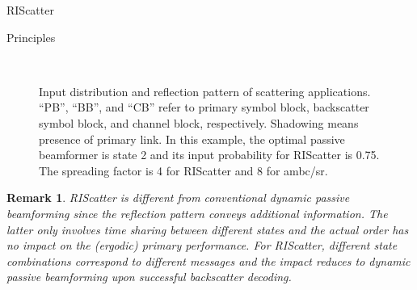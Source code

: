 \documentclass[journal]{IEEEtran}
\newtheorem{remark}{Remark}
\begin{document}
\begin{section}{RIScatter}
\begin{subsection}{Principles}
\begin{figure}[!t]
			\centering
			\\
			\caption{
				Input distribution and reflection pattern of scattering applications.
				``PB'', ``BB'', and ``CB'' refer to primary symbol block, backscatter symbol block, and channel block, respectively.
				Shadowing means presence of primary link.
				In this example, the optimal passive beamformer is state \num{2} and its input probability for RIScatter is \num{0.75}.
				The spreading factor is \num{4} for RIScatter and \num{8} for \gls{ambc}/\gls{sr}.
			}
			\label{fg:scatter_comparison}
		\end{figure}
		\begin{remark}
			RIScatter is different from conventional dynamic passive beamforming since the reflection pattern conveys additional information.
			The latter only involves time sharing between different states and the actual order has no impact on the (ergodic) primary performance.
			For RIScatter, different state combinations correspond to different messages and the impact reduces to dynamic passive beamforming upon successful backscatter decoding.
		\end{remark}


\end{subsection}
\end{section}
\end{document}
